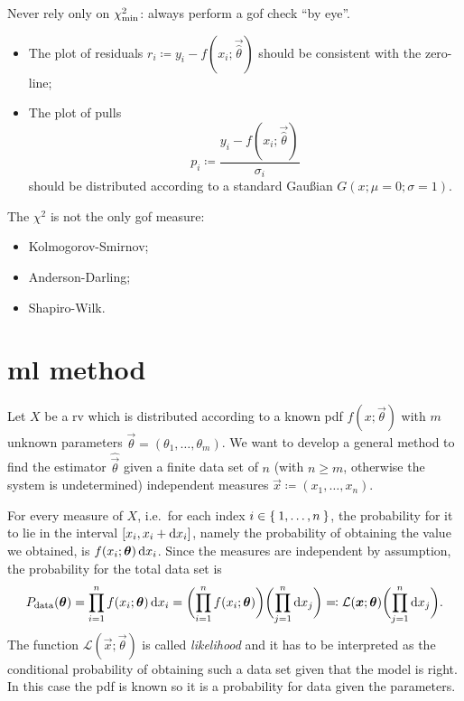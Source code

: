 \documentclass[
	10pt,
	draft
]{scrreprt}
\newcommand{\lkhd}{\ensuremath{\mathcal{L}}}
\begin{document}
Never rely only on $\chi^2_\textup{min}$: always perform a \ac{gof} check ``by eye''.
\begin{itemize}
	\item
The plot of residuals $r_i \coloneqq y_i - f(x_i;\vec{\hat\theta})$ should be consistent with the zero-line;
	\item
The plot of pulls
\begin{equation}
p_i \coloneqq \frac{y_i - f(x_i;\vec{\hat\theta})}{\sigma_i}
\end{equation}
should be distributed according to a standard Gau\ss{}ian $G(x;\mu=0;\sigma = 1)$.
\end{itemize}



The $\chi^2$ is not the only \ac{gof} measure:
\begin{itemize}
	\item
Kolmogorov-Smirnov;
	\item
Anderson-Darling;
	\item
Shapiro-Wilk.
\end{itemize}

		\section{\acl{ml} method}

Let $X$ be a \ac{rv} which is distributed according to a known \ac{pdf} $f(x;\vec{\theta})$ with $m$ unknown parameters $\vec{\theta} = (\theta_1,\dots,\theta_m)$.
We want to develop a general method to find the estimator $\hat{\vec{\theta}}$ given a finite data set of $n$ (with $n\ge m$, otherwise the system is undetermined) independent measures $\vec{x}\coloneqq (x_1,\dots,x_n)$.


For every measure of $X$, i.e.~for each index $i \in\Set{1,\dots,n}$, the probability for it to lie in the interval $[x_i,x_i+\mathop{}\!\mathrm{d} x_i]$, namely the probability of obtaining the value we obtained, is $f(x_i;\bm{{\theta}})\mathop{}\!\mathrm{d} x_i$.
Since the measures are independent by assumption, the probability for the total data set is
\begin{equation}
P_\textup{data}(\vec{\theta})
= \prod_{i=1}^n f(x_i;\vec{\theta})\ud x_i
=\biggl(\prod_{i=1}^n f(x_i;\vec{\theta}) \biggr)\biggl(\prod_{j=1}^n \ud x_j\biggr)
\eqqcolon \lkhd(\vec{x};\vec{\theta})\biggl(\prod_{j=1}^n \ud x_j\biggr).
\end{equation}
The function $\lkhd(\vec{x};\vec{\theta})$ is called \emph{likelihood} and it has to be interpreted as the conditional probability of obtaining such a data set given that the model is right.
In this case the \ac{pdf} is known so it is a probability for data given the parameters.
\end{document}
